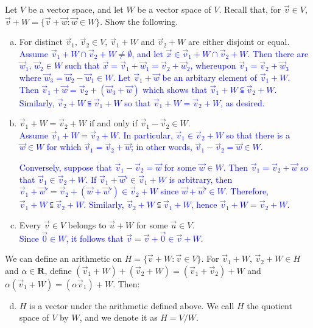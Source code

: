 \documentclass[a4paper,11pt]{article}
\newcommand{\R}{\mathbf{R}}
\newcommand{\BB}[1]{\textcolor{blue}{#1}}
\begin{document}
 Let $V$ be a vector space, and let $W$ be a
vector space of $V$. Recall that, for $\vec v \in V$, $\vec v + W = \{\vec
v+\vec w : \vec w \in W\}$. Show the following.
\begin{enumerate}[(a)]
\item For distinct $\vec v_1,\,\vec v_2 \in V$, $\vec v_1+W$ and $\vec v_2+W$
   are either disjoint or equal. \\

  \BB{Assume $\vec v_1 + W \cap \vec v_2 + W \neq \emptyset$, and let $\vec x
    \in \vec v_1 + W \cap \vec v_2 + W$. Then there are $\vec w_1,\,\vec w_2 \in
    W$ such that $\vec x = \vec v_1+\vec w_1=\vec v_2+\vec w_2$, whereupon $\vec
    v_1 = \vec v_2+\vec w_3$ where $\vec w_3=\vec w_2-\vec w_1 \in W$. Let $\vec
    v_1+\vec w$ be an arbitary element of $\vec v_1+W$. Then $\vec v_1+\vec w =
    \vec v_2+(\vec w_3+\vec w)$ which shows that $\vec v_1+W \subseteqq \vec
    v_2+W$. Similarly, $\vec v_2+W \subseteqq \vec v_1+W$ so that $\vec
    v_1+W=\vec v_2+W$, as desired. \\}
  
\item $\vec v_1+W = \vec v_2+W$ if and only if $\vec v_1 - \vec v_2 \in W$. \\

  \BB{Assume $\vec v_1+W = \vec v_2+W$. In particular, $\vec v_1 \in \vec
    v_2+W$ so that there is a $\vec w \in W$ for which $\vec v_1=\vec v_2+\vec
    w$; in other words, $\vec v_1-\vec v_2 = \vec w \in W$.}

  \BB{Conversely, suppose that $\vec v_1 - \vec v_2 = \vec w$ for some $\vec w
    \in W$. Then $\vec v_1 = \vec v_2 + \vec w$ so that $\vec v_1 \in \vec
    v_2+W$. If $\vec v_1+\vec w' \in \vec v_1+W$ is arbitrary, then $\vec
    v_1+\vec w' = \vec v_2+(\vec w+\vec w') \in \vec v_2+W$ since $\vec w+\vec
    w' \in W$. Therefore, $\vec v_1+W \subseteqq \vec v_2+W$. Similarly, $\vec
    v_2+W \subseteqq \vec v_1+W$, hence $\vec v_1+W = \vec v_2+W$. \\}
  
\item Every $\vec v \in V$ belongs to $\vec u+W$ for some $\vec u \in V$. \\

  \BB{Since $\vec 0 \in W$, it follows that $\vec v = \vec v+\vec 0 \in \vec v
    +W$. \\}
\end{enumerate}
We can define an arithmetic on $H = \{\vec v+W : \vec v \in V\}$. For $\vec
v_1+W,\,\vec v_2+W \in H$ and $\alpha \in \R$, define $(\vec v_1+W)+(\vec v_2+W)
= (\vec v_1+\vec v_2)+W$ and $\alpha(\vec v_1 + W) = (\alpha\vec v_1)+W$. Then:
\begin{enumerate}[(a)]
  \setcounter{enumi}{3}
\item $H$ is a vector under the arithmetic defined above. We call $H$ the
  quotient space of $V$ by $W$, and we denote it as $H = V/W$.
\end{enumerate}
\end{document}
